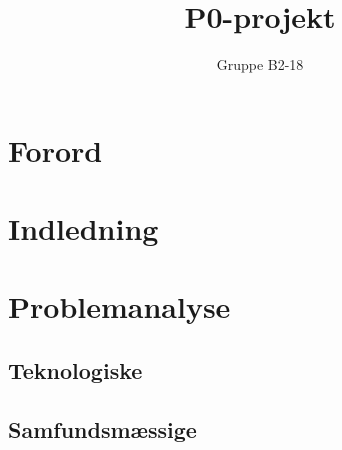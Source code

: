 \documentclass[12pt,hidelinks]{article}
\begin{document}
    \sloppy
	\title{P0-projekt}
	\author{Gruppe B2-18}
	\maketitle
	\section{Forord}
	\tableofcontents
	\section{Indledning}
	\section{Problemanalyse}
	
	\subsection{Teknologiske}
	
	
	
    
	\subsection{Samfundsmæssige}
	
	
	
	
\end{document}
